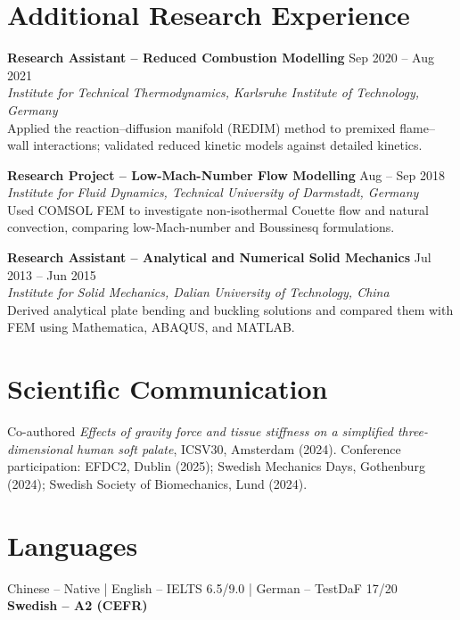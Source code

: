 \documentclass[a4paper,10pt]{article}
\begin{document}
\section{Additional Research Experience}
\textbf{Research Assistant -- Reduced Combustion Modelling} \hfill Sep 2020 -- Aug 2021\\
\textit{Institute for Technical Thermodynamics, Karlsruhe Institute of Technology, Germany}\\
Applied the reaction--diffusion manifold (REDIM) method to premixed flame--wall interactions;
validated reduced kinetic models against detailed kinetics.

\vspace{4pt}
\textbf{Research Project -- Low-Mach-Number Flow Modelling} \hfill Aug -- Sep 2018\\
\textit{Institute for Fluid Dynamics, Technical University of Darmstadt, Germany}\\
Used COMSOL FEM to investigate non-isothermal Couette flow and natural convection,
comparing low-Mach-number and Boussinesq formulations.

\vspace{4pt}
\textbf{Research Assistant -- Analytical and Numerical Solid Mechanics} \hfill Jul 2013 -- Jun 2015\\
\textit{Institute for Solid Mechanics, Dalian University of Technology, China}\\
Derived analytical plate bending and buckling solutions and compared them with FEM
using Mathematica, ABAQUS, and MATLAB.

\section{Scientific Communication}
Co-authored \textit{Effects of gravity force and tissue stiffness on a simplified
three-dimensional human soft palate}, ICSV30, Amsterdam (2024).
Conference participation: EFDC2, Dublin (2025); Swedish Mechanics Days, Gothenburg (2024);
Swedish Society of Biomechanics, Lund (2024).

\section{Languages}
Chinese -- Native \quad | \quad English -- IELTS 6.5/9.0 \quad | \quad
German -- TestDaF 17/20\\
\textbf{Swedish -- A2 (CEFR)}
\end{document}
